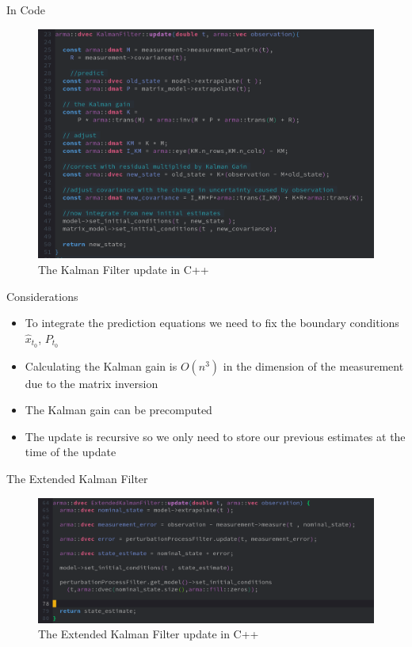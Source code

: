 \documentclass{beamer}
\begin{document}
\begin{frame}{In Code}

  \begin{figure}
    \includegraphics[scale=0.3]{kalman_implementation.png}
    \caption{The Kalman Filter update in C++}
  \end{figure}
\end{frame}

\begin{frame}{Considerations}
  \begin{itemize}
   \pause
\item To integrate the prediction equations we need to fix the boundary
  conditions $\hat{x}_{t_0}$, $P_{t_0}$
   \pause
  \item Calculating the Kalman gain is $O(n^3)$ in the dimension of the
    measurement due to the matrix inversion
    \pause
  \item The Kalman gain can be precomputed
    \pause 
\item The update is recursive so we only need to store our previous estimates at
  the time of the update
 
  \end{itemize}

\end{frame}
 
\begin{frame}{The Extended Kalman Filter}

\begin{figure}
  \includegraphics[scale=0.3]{ekf_implementation.png}
  \caption{The Extended Kalman Filter update in C++}

\end{figure}
\end{frame}
\end{document}
